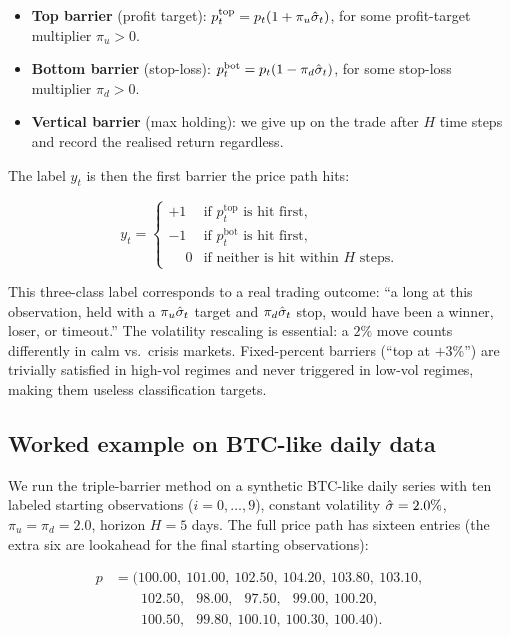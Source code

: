 \begin{itemize}
  \item \textbf{Top barrier} (profit target):
  $p^{\mathrm{top}}_t = p_t (1 + \pi_u \hat{\sigma}_t)$, for some
  profit-target multiplier $\pi_u > 0$.
  \item \textbf{Bottom barrier} (stop-loss):
  $p^{\mathrm{bot}}_t = p_t (1 - \pi_d \hat{\sigma}_t)$, for some
  stop-loss multiplier $\pi_d > 0$.
  \item \textbf{Vertical barrier} (max holding): we give up on
  the trade after $H$ time steps and record the realised return
  regardless.
\end{itemize}

The label $y_t$ is then the first barrier the price path hits:

\[
y_t = \begin{cases}
+1 & \text{if } p^{\mathrm{top}}_t \text{ is hit first,} \\
-1 & \text{if } p^{\mathrm{bot}}_t \text{ is hit first,} \\
\phantom{+}0 & \text{if neither is hit within } H \text{ steps.}
\end{cases}
\]

This three-class label corresponds to a real trading outcome:
``a long at this observation, held with a $\pi_u \hat{\sigma}_t$
target and $\pi_d \hat{\sigma}_t$ stop, would have been a winner,
loser, or timeout.'' The volatility rescaling is essential: a $2\%$
move counts differently in calm vs.\ crisis markets. Fixed-percent
barriers (``top at $+3\%$'') are trivially satisfied in high-vol
regimes and never triggered in low-vol regimes, making them
useless classification targets.

\subsection{Worked example on BTC-like daily data}
\label{subsec:ml_tb_worked}

We run the triple-barrier method on a synthetic BTC-like daily
series with ten labeled starting observations ($i = 0, \ldots, 9$),
constant volatility $\hat{\sigma} = 2.0\%$, $\pi_u = \pi_d = 2.0$,
horizon $H = 5$ days. The full price path has sixteen entries (the
extra six are lookahead for the final starting observations):

\[
\begin{aligned}
p &= (100.00,\ 101.00,\ 102.50,\ 104.20,\ 103.80,\ 103.10,\\
&\phantom{= (}\ 102.50,\ \phantom{0}98.00,\ \phantom{0}97.50,\ \phantom{0}99.00,\ 100.20,\\
&\phantom{= (}\ 100.50,\ \phantom{0}99.80,\ 100.10,\ 100.30,\ 100.40).
\end{aligned}
\]

